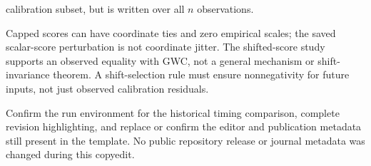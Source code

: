 \documentclass[11pt]{article}
\begin{document}
\begin{description}[style=nextline,leftmargin=0pt,font=\normalfont\bfseries]
calibration subset, but is written over all $n$ observations.
\item[AUTHOR-CHECK TIES / SHIFT]
Capped scores can have coordinate ties and zero empirical scales; the saved
scalar-score perturbation is not coordinate jitter. The shifted-score
study supports an observed equality with GWC, not a general mechanism or
shift-invariance theorem. A shift-selection rule must ensure nonnegativity
for future inputs, not just observed calibration residuals.
\item[AUTHOR-CHECK REPRO / COLOR / METADATA]
Confirm the run environment for the historical timing comparison, complete
revision highlighting, and replace or confirm the editor and publication
metadata still present in the template. No public repository release or
journal metadata was changed during this copyedit.
\end{description}
\end{document}
